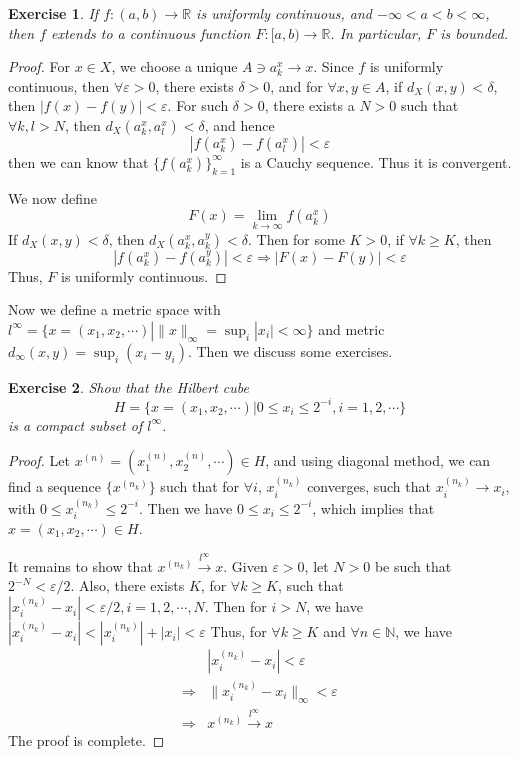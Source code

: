 \documentclass[12pt,leqno]{amsart}
\newtheorem{exercise}{Exercise}[section]
\theoremstyle{definition}
\numberwithin{equation}{subsection}
\begin{document}
\begin{exercise}
If $f:(a,b)\to\mathbb{R}$ is uniformly continuous, and $-\infty < a < b < \infty$, then $f$ extends to a continuous function $F:[a,b)\to\mathbb{R}$. In particular, $F$ is bounded.
\end{exercise}

\begin{proof}
For $x\in X$, we choose a unique $A\ni a_k^x\to x$. Since $f$ is uniformly continuous, then $\forall\varepsilon > 0$, there exists $\delta > 0$, and for $\forall x,y\in A$, if $d_X(x,y) < \delta$, then $|f(x) - f(y)| < \varepsilon$. For such $\delta > 0$, there exists a $N > 0$ such that $\forall k,l > N$, then $d_X(a_k^x, a_l^x) < \delta$, and hence $$|f(a_k^x) - f(a_l^x)| < \varepsilon$$
then we can know that $\{f(a_k^x)\}^\infty_{k=1}$ is a Cauchy sequence. Thus it is convergent. 

We now define $$F(x) = \lim_{k\to\infty}f(a_k^x)$$
If $d_X(x,y) < \delta$, then $d_X(a_k^x,a_k^y) < \delta$. Then for some $K > 0$, if $\forall k \geq K$, then $$|f(a_k^x) - f(a_k^y)| < \varepsilon \Rightarrow |F(x) - F(y)| < \varepsilon$$
Thus, $F$ is uniformly continuous.
\end{proof}

\medskip

Now we define a metric space with $l^\infty = \{x = (x_1,x_2,\cdots) | \|x\|_\infty = \sup_i |x_i| < \infty\}$ and metric $d_\infty(x,y) = \sup_i (x_i - y_i)$. Then we discuss some exercises. 

\begin{exercise}
Show that the Hilbert cube 
$$H = \{x = (x_1,x_2,\cdots) | 0\leq x_i \leq 2^{-i}, i = 1,2,\cdots\}$$
is a compact subset of $l^\infty$.
\end{exercise}
\begin{proof}
Let $x^{(n)} = \left(x_1^{(n)},x_2^{(n)},\cdots \right)\in H$, and using diagonal method, we can find a sequence $\{x^{(n_k)}\}$ such that for $\forall i$, $x_i^{(n_k)}$ converges, such that $x_i^{(n_k)}\to x_i$, with $0\leq x_i^{(n_k)}\leq 2^{-i}$. Then we have $0\leq x_i\leq 2^{-i}$, which implies that $x = \left(x_1, x_2, \cdots \right)\in H$. 

It remains to show that $x^{(n_k)}\stackrel{l^\infty}{\longrightarrow}x$. Given $\varepsilon > 0$, let $N > 0$ be such that $2^{-N} < \varepsilon/2$. Also, there exists $K$, for $\forall k \geq K$, such that $\left|x_i^{(n_k)} - x_i\right| < \varepsilon/2, i = 1,2,\cdots, N$. Then for $i > N$, we have 
$\left|x_i^{(n_k)} - x_i\right| < \left|x_i^{(n_k)}\right| + |x_i| < \varepsilon$
Thus, for $\forall k \geq K$ and $\forall n\in \mathbb{N}$, we have 
\begin{align*}
    & \left|x_i^{(n_k)} - x_i\right| < \varepsilon \\
    \Rightarrow & \|x_i^{(n_k)} - x_i\|_\infty < \varepsilon \\
    \Rightarrow & x^{(n_k)}\stackrel{l^\infty}{\longrightarrow}x
\end{align*}
The proof is complete.
\end{proof}
\end{document}
